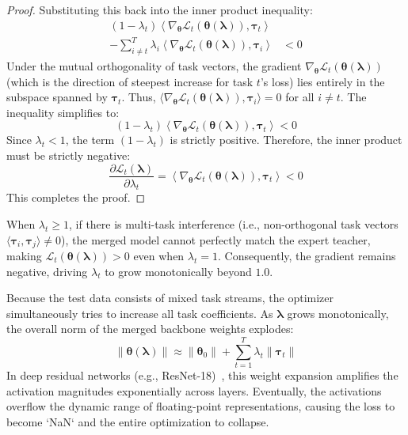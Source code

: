 \documentclass{article}
\theoremstyle{plain}
\theoremstyle{definition}
\theoremstyle{remark}
\begin{document}
\begin{proof}
Substituting this back into the inner product inequality:
\begin{equation}
\begin{split}
    (1 - \lambda_t)\left\langle \nabla_{\boldsymbol{\theta}} \mathcal{L}_t(\boldsymbol{\theta}(\boldsymbol{\lambda})), \boldsymbol{\tau}_t \right\rangle & \\
    - \sum_{i \neq t}^T \lambda_i \left\langle \nabla_{\boldsymbol{\theta}} \mathcal{L}_t(\boldsymbol{\theta}(\boldsymbol{\lambda})), \boldsymbol{\tau}_i \right\rangle & < 0
\end{split}
\end{equation}
Under the mutual orthogonality of task vectors, the gradient $\nabla_{\boldsymbol{\theta}} \mathcal{L}_t(\boldsymbol{\theta}(\boldsymbol{\lambda}))$ (which is the direction of steepest increase for task $t$'s loss) lies entirely in the subspace spanned by $\boldsymbol{\tau}_t$. Thus, $\langle \nabla_{\boldsymbol{\theta}} \mathcal{L}_t(\boldsymbol{\theta}(\boldsymbol{\lambda})), \boldsymbol{\tau}_i \rangle = 0$ for all $i \neq t$. The inequality simplifies to:
\begin{equation}
    (1 - \lambda_t)\left\langle \nabla_{\boldsymbol{\theta}} \mathcal{L}_t(\boldsymbol{\theta}(\boldsymbol{\lambda})), \boldsymbol{\tau}_t \right\rangle < 0
\end{equation}
Since $\lambda_t < 1$, the term $(1 - \lambda_t)$ is strictly positive. Therefore, the inner product must be strictly negative:
\begin{equation}
    \frac{\partial \mathcal{L}_t(\boldsymbol{\lambda})}{\partial \lambda_t} = \left\langle \nabla_{\boldsymbol{\theta}} \mathcal{L}_t(\boldsymbol{\theta}(\boldsymbol{\lambda})), \boldsymbol{\tau}_t \right\rangle < 0
\end{equation}
This completes the proof.
\end{proof}

When $\lambda_t \geq 1$, if there is multi-task interference (i.e., non-orthogonal task vectors $\langle \boldsymbol{\tau}_i, \boldsymbol{\tau}_j \rangle \neq 0$), the merged model cannot perfectly match the expert teacher, making $\mathcal{L}_t(\boldsymbol{\theta}(\boldsymbol{\lambda})) > 0$ even when $\lambda_t = 1$. Consequently, the gradient remains negative, driving $\lambda_t$ to grow monotonically beyond $1.0$.

Because the test data consists of mixed task streams, the optimizer simultaneously tries to increase all task coefficients. As $\boldsymbol{\lambda}$ grows monotonically, the overall norm of the merged backbone weights explodes:
\begin{equation}
    \|\boldsymbol{\theta}(\boldsymbol{\lambda})\| \approx \|\boldsymbol{\theta}_0\| + \sum_{t=1}^T \lambda_t \|\boldsymbol{\tau}_t\|
\end{equation}
In deep residual networks (e.g., ResNet-18)~\cite{he2016deep}, this weight expansion amplifies the activation magnitudes exponentially across layers. Eventually, the activations overflow the dynamic range of floating-point representations, causing the loss to become `NaN` and the entire optimization to collapse.
\end{document}

